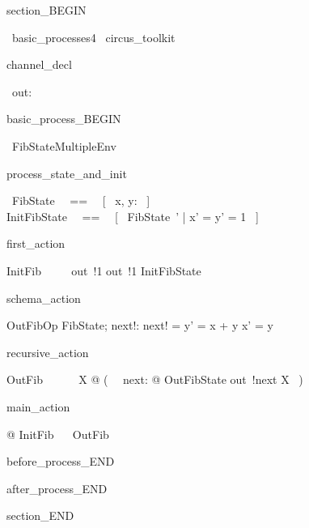 section_BEGIN
\begin{zsection}
  \SECTION\ basic\_processes4 \parents\ circus\_toolkit
\end{zsection}
channel_decl
\begin{circus}
    \circchannel\ out: \nat
\end{circus}
basic_process_BEGIN
\begin{circus}
    \circprocess\ FibStateMultipleEnv ~~\circdef~~ \circbegin
\end{circus}
process_state_and_init
\begin{circusaction}
    \circstate\ FibState ~~==~~ [~ x, y: \nat ~] \\
    InitFibState ~~==~~ [~ FibState~' | x' = y' = 1 ~]
\end{circusaction}
first_action
\begin{circusaction}
    InitFib ~~\circdef~~ out~!1 \then out~!1 \then InitFibState
\end{circusaction}
schema_action
\begin{schema}{OutFibOp}
    \Delta FibState; next!: \nat
\where
    next! = y' = x + y \land x' = y
\end{schema}
recursive_action
\begin{circusaction}
    OutFib ~~\circdef~~ \circmu\ X @ (~ \circvar\ next: \nat @ OutFibState \circseq out~!next \then X ~)
\end{circusaction}
main_action
\begin{circusaction}
    @ InitFib ~\circseq~ OutFib
\end{circusaction}
before_process_END
\begin{circus}
    \circend
\end{circus}
after_process_END

section_END 